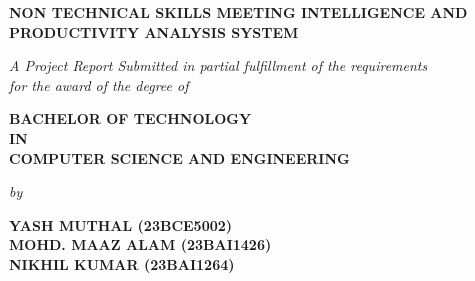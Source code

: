 \documentclass[12pt,a4paper,oneside]{report}
\begin{document}

\begin{titlepage}
\thispagestyle{empty}
\begin{center}
  \vspace*{0.5cm}

  
  \vspace{0.8cm}
  
  {\fontsize{20}{24}\bfseries NON TECHNICAL SKILLS MEETING INTELLIGENCE AND PRODUCTIVITY ANALYSIS SYSTEM\par}
  
  \vspace{0.8cm}
  
  {\fontsize{13}{16}\itshape A Project Report Submitted in partial fulfillment of the requirements\\for the award of the degree of\par}
  
  \vspace{0.6cm}
  
  {\fontsize{16}{20}\bfseries BACHELOR OF TECHNOLOGY\\IN\\COMPUTER SCIENCE AND ENGINEERING\par}
  
  \vspace{0.8cm}
  
  {\fontsize{13}{16}\itshape by\par}
  
  \vspace{0.4cm}
  
  {\fontsize{14}{18}\bfseries
  YASH MUTHAL \quad (23BCE5002)\\[4pt]
  MOHD. MAAZ ALAM \quad (23BAI1426)\\[4pt]
  NIKHIL KUMAR \quad (23BAI1264)\par}
  

\end{center}
\end{titlepage}
\end{document}

